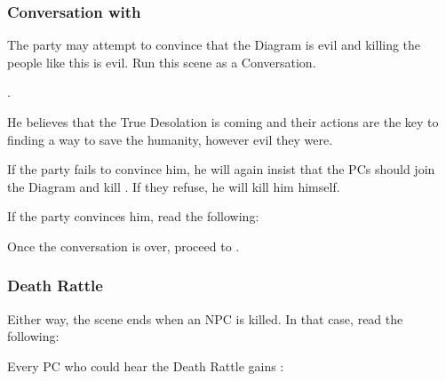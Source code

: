 \subsubsection{Conversation with \npcDiagramSurgeonName{}}
\label{ssec:conclaveHospitalPatientConversation}

The party may attempt to convince \npcDiagramSurgeon{} that the Diagram is evil and killing the people like this is evil. Run this scene as a Conversation.

. 

He believes that the True Desolation is coming and their actions are the key to finding a way to save the humanity, however evil they were.


If the party fails to convince him, he will again insist that the PCs should join the Diagram and kill \npcGhostbloodWounded{}. If they refuse, he will kill him himself.

If the party convinces him, read the following:


Once the conversation is over, proceed to .


\subsubsection{Death Rattle}
\label{ssec:conclaveHospitalPatientDeathRattle}

Either way, the scene ends when an NPC is killed. In that case, read the following:


Every PC who could hear the Death Rattle gains \abilityFutureKnowledgeName[1]{}: 

